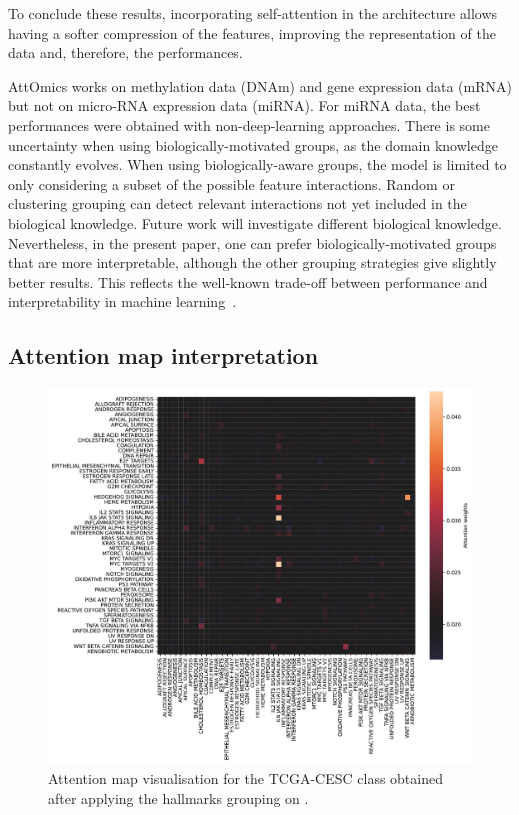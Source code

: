 \documentclass[../main.tex]{subfiles}
\begin{document}
		To conclude these results, incorporating self-attention in the architecture allows having a softer compression of the features, improving the representation of the data and, therefore, the performances.

		AttOmics works on methylation data (DNAm) and gene expression data (mRNA) but not on micro-RNA expression data (miRNA).
		For miRNA data, the best performances were obtained with non-deep-learning approaches.
		There is some uncertainty when using biologically-motivated groups, as the domain knowledge constantly evolves.
		When using biologically-aware groups, the model is limited to only considering a subset of the possible feature interactions.
		Random or clustering grouping can detect relevant interactions not yet included in the biological knowledge.
		Future work will investigate different biological knowledge.
		Nevertheless, in the present paper, one can prefer biologically-motivated groups that are more interpretable, although the other grouping strategies give slightly better results.
		This reflects the well-known trade-off between performance and interpretability in machine learning~\cite{Linardatos2021_ExplainableAI}.

	\subsection{Attention map interpretation}

		\begin{figure}[htbp]
			\centering
			\includegraphics[width=\linewidth]{Beaude.168.fig.4.pdf}
			\caption{Attention map visualisation for the TCGA-CESC class obtained after applying the hallmarks grouping on .}\label{fig:att_map_viz}
		\end{figure}
\end{document}
